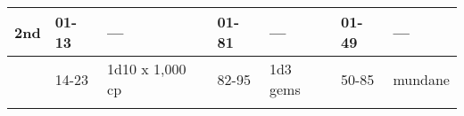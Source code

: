 \begin{longtable}{llllllllllllll}
\multicolumn{8}{p{1.150in}|}{\begin{minipage}[t]{1.150in}\centering
2nd\end{minipage}} & \multicolumn{1}{|p{0.393in}|}{\begin{minipage}[t]{0.393in}\raggedright
01-13\end{minipage}} & \multicolumn{1}{p{0.469in}|}{\begin{minipage}[t]{0.469in}\raggedright
---\end{minipage}} & \multicolumn{1}{p{0.923in}|}{\begin{minipage}[t]{0.923in}\raggedright
01-81\end{minipage}} & \multicolumn{1}{p{0.469in}|}{\begin{minipage}[t]{0.469in}\raggedright
---\end{minipage}} & \multicolumn{1}{p{0.626in}|}{\begin{minipage}[t]{0.626in}\raggedright
01-49\end{minipage}} & \multicolumn{1}{p{0.469in}|}{\begin{minipage}[t]{0.469in}\centering
---\end{minipage}}\\
\hline
\multicolumn{8}{p{1.150in}|}{\begin{minipage}[t]{1.150in}\centering
\end{minipage}} & \multicolumn{1}{|p{0.393in}|}{\begin{minipage}[t]{0.393in}\raggedright
14-23\end{minipage}} & \multicolumn{1}{p{0.469in}|}{\begin{minipage}[t]{0.469in}\raggedright
1d10 x 1,000 cp\end{minipage}} & \multicolumn{1}{p{0.923in}|}{\begin{minipage}[t]{0.923in}\raggedright
82-95\end{minipage}} & \multicolumn{1}{p{0.469in}|}{\begin{minipage}[t]{0.469in}\raggedright
1d3 gems\end{minipage}} & \multicolumn{1}{p{0.626in}|}{\begin{minipage}[t]{0.626in}\raggedright
50-85\end{minipage}} & \multicolumn{1}{p{0.469in}|}{\begin{minipage}[t]{0.469in}\centering
1 mundane\end{minipage}}\\
\hline
\multicolumn{8}{p{1.150in}|}{\begin{minipage}[t]{1.150in}\centering

\end{minipage}}
\end{longtable}
